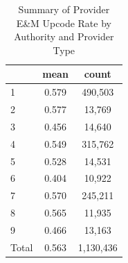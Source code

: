 \begin{table}[htbp]\centering
\def\sym#1{\ifmmode^{#1}\else\(^{#1}\)\fi}
\caption{Summary of Provider E\&M Upcode Rate by Authority and Provider Type}
\begin{tabular}{l*{1}{cc}}
\toprule
                    &        mean&       count\\
\midrule
1                   &       0.579&     490,503\\
2                   &       0.577&      13,769\\
3                   &       0.456&      14,640\\
4                   &       0.549&     315,762\\
5                   &       0.528&      14,531\\
6                   &       0.404&      10,922\\
7                   &       0.570&     245,211\\
8                   &       0.565&      11,935\\
9                   &       0.466&      13,163\\
Total               &       0.563&   1,130,436\\
\bottomrule
\end{tabular}
\end{table}
